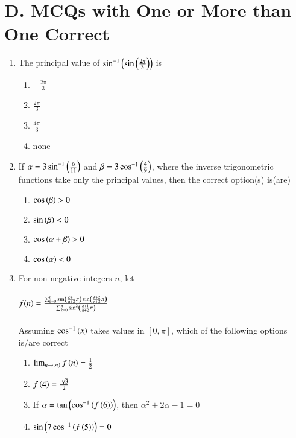\documentclass[journal,12pt,twocolumn,article]{IEEEtran}
\theoremstyle{remark}
\begin{document}
\section*{D. MCQs with One or More than One Correct}
\begin{enumerate}
\item The principal value of $\sin ^{-1}\left(\sin \left(\frac{2\pi}{3}\right)\right)$ is
\hfill {}
\begin{multicols}{2}
\begin{enumerate}
\item $-\frac{2\pi}{3}$ 
\item $\frac{2\pi}{3}$ 
\columnbreak
\item $\frac{4\pi}{3}$ 
\item none
\end{enumerate}
\end{multicols}
\item If $\alpha=3\sin ^{-1}\left(\frac{6}{11}\right)$ and $\beta=3\cos ^{-1}\left(\frac{4}{9}\right)$, where the inverse trigonometric functions take only the principal values, then the correct option(s) is(are)
\hfill {}
\begin{multicols}{2}
\begin{enumerate} 
\item $\cos \left(\beta\right)>0$ 
\item $\sin \left(\beta\right)<0$
\columnbreak
\item $\cos \left(\alpha + \beta\right) > 0$ 
\item $\cos \left(\alpha\right)<0$
\end{enumerate}
\end{multicols}
\item For non-negative integers $n$, let \\\\
$f(n)= \frac{\sum_{k=0}^{n} \sin \left(\frac{k+1}{n+2}\pi\right)\sin \left(\frac{k+2}{n+2}\pi\right)}{\sum_{k=0}^{n} \sin ^2 \left(\frac{k+1}{n+2}\pi\right)}$\\\\
Assuming $\cos ^{-1}\left(x\right)$ takes values in $[0,\pi]$, which of the following options is/are correct
\hfill {}
\begin{multicols}{2}
\begin{enumerate}
\item $\lim_{n \rightarrow \infty)} f\left(n\right) = \frac{1}{2}$ 
\item $f\left(4\right)=\frac{\sqrt{3}}{2}$
\columnbreak
\item If $\alpha = \tan \left(\cos ^{-1}\left(f\left(6\right)\right)\right)$, then $\alpha ^2 + 2\alpha -1 =0$
\item $\sin \left(7\cos ^{-1}\left(f\left(5\right)\right)\right)=0$
\end{enumerate}
\end{multicols}
\end{enumerate}
\end{document}
